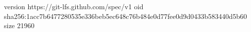 version https://git-lfs.github.com/spec/v1
oid sha256:1acc7b6477280535e336beb5ec648c76b484e0d77fee0d9d0433b583440d5b60
size 21960
